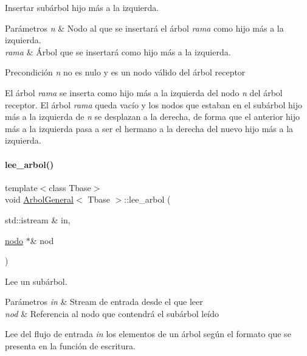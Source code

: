 Insertar subárbol hijo más a la izquierda. 


\begin{DoxyParams}{Parámetros}
{\em n} & Nodo al que se insertará el árbol {\itshape rama} como hijo más a la izquierda. \\
\hline
{\em rama} & Árbol que se insertará como hijo más a la izquierda. \\
\hline
\end{DoxyParams}
\begin{DoxyPrecond}{Precondición}
{\itshape n} no es nulo y es un nodo válido del árbol receptor
\end{DoxyPrecond}
El árbol {\itshape rama} se inserta como hijo más a la izquierda del nodo {\itshape n} del árbol receptor. El árbol {\itshape rama} queda vacío y los nodos que estaban en el subárbol hijo más a la izquierda de {\itshape n} se desplazan a la derecha, de forma que el anterior hijo más a la izquierda pasa a ser el hermano a la derecha del nuevo hijo más a la izquierda. \hypertarget{classArbolGeneral_a73927127a9f5c4e96eccb615ee09077a}{}\label{classArbolGeneral_a73927127a9f5c4e96eccb615ee09077a} 
\paragraph{\texorpdfstring{lee\+\_\+arbol()}{lee\_arbol()}}
{\footnotesize\ttfamily template$<$class Tbase$>$ \\
void \hyperlink{classArbolGeneral}{Arbol\+General}$<$ Tbase $>$\+::lee\+\_\+arbol (\begin{DoxyParamCaption}\item[{std\+::istream \&}]{in,  }\item[{\hyperlink{structArbolGeneral_1_1nodo}{nodo} $\ast$\&}]{nod }\end{DoxyParamCaption})\hspace{0.3cm}{\ttfamily [private]}}



Lee un subárbol. 


\begin{DoxyParams}{Parámetros}
{\em in} & Stream de entrada desde el que leer \\
\hline
{\em nod} & Referencia al nodo que contendrá el subárbol leído\\
\hline
\end{DoxyParams}
Lee del flujo de entrada {\itshape in} los elementos de un árbol según el formato que se presenta en la función de escritura.

